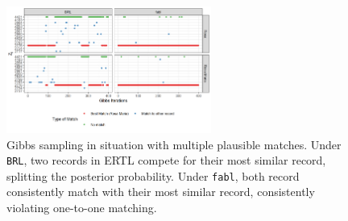 \documentclass[12pt,letterpaper]{article}
\newcommand{\1}[1]{\mathbb{I}\!\left[#1\right]} %
\begin{document}
\begin{figure}[h!]
\begin{center}
\includegraphics[width=0.6\textwidth]{../notes/figures/el_salvador/bad_mixing} 
\caption{Gibbs sampling in situation with multiple plausible matches. Under \texttt{BRL}, two records in ERTL compete for their most similar record, splitting the posterior probability. Under \texttt{fabl}, both record consistently match with their most similar record, consistently violating one-to-one matching.} \label{fig:mixing-plot}
\end{center}
\end{figure}


%	
%		
%	
\end{document}
